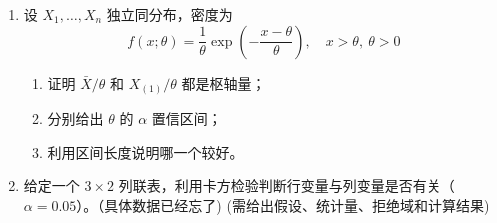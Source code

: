 \begin{enumerate}
\begin{enumerate}
\item 进行方差相等假设检验；
\item 判断能否说明两总体均值不同。
\end{enumerate}

（需给出假设、统计量、拒绝域和计算结果）


\item 设 $X_1,\dots,X_n$ 独立同分布，密度为
\[
f(x;\theta)=\frac{1}{\theta}\exp\left(-\frac{x-\theta}{\theta}\right),\quad x>\theta,\ \theta>0
\]

\begin{enumerate}
\item 证明 $\bar{X}/\theta$ 和 $X_{(1)}/\theta$ 都是枢轴量；
\item 分别给出 $\theta$ 的 $\alpha$ 置信区间；
\item 利用区间长度说明哪一个较好。
\end{enumerate}



\item 给定一个 $3\times 2$ 列联表，利用卡方检验判断行变量与列变量是否有关（$\alpha=0.05$）。（具体数据已经忘了)
(需给出假设、统计量、拒绝域和计算结果)
\end{enumerate}


